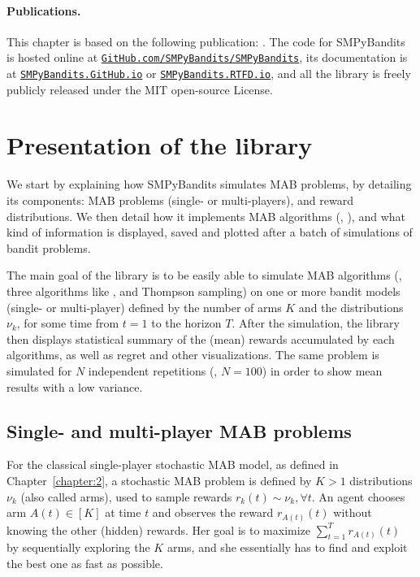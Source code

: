 \paragraph{Publications.}
%
This chapter is based on the following publication: \cite{SMPyBanditsJMLR}.
The code for SMPyBandits is hosted online at \texttt{\href{https://GitHub.com/SMPyBandits/SMPyBandits/}{GitHub.com/SMPyBandits/SMPyBandits}}, its documentation is at \texttt{\href{https://SMPyBandits.GitHub.io/}{SMPyBandits.GitHub.io}} or \texttt{\href{https://SMPyBandits.RTFD.io/}{SMPyBandits.RTFD.io}}, and all the library is freely publicly released under the MIT open-source License.


\section{Presentation of the library}
\label{sec:3:presentationLibrary}


We start by explaining how SMPyBandits simulates MAB problems, by detailing its components:
MAB problems (single- or multi-players),
and reward distributions.
%
We then detail how it implements MAB algorithms (\eg, \UCB),
and what kind of information is displayed, saved and plotted after a batch of simulations of bandit problems.

The main goal of the library is to be easily able to simulate MAB algorithms (\eg, three algorithms like \UCB, \klUCB{} and Thompson sampling) on one or more bandit models (single- or multi-player) defined by the number of arms $K$ and the distributions $\nu_k$, for some time from $t=1$ to the horizon $T$.
After the simulation, the library then displays statistical summary of the (mean) rewards accumulated by each algorithms, as well as regret and other visualizations.
The same problem is simulated for $N$ independent repetitions (\eg, $N=100$) in order to show mean results with a low variance.


\subsection{Single- and multi-player MAB problems}

For the classical single-player stochastic MAB model, as defined in Chapter~\ref{chapter:2},
a stochastic MAB problem is defined by $K>1$ distributions $\nu_k$ (also called arms),
used to sample \iid{} rewards $r_k(t) \sim \nu_k, \forall t$.
An agent chooses arm $A(t)\in[K]$ at time $t$ and observes the reward $r_{A(t)}(t)$ without knowing the other (hidden) rewards.
Her goal is to maximize $\sum_{t=1}^T r_{A(t)}(t)$ by sequentially exploring the $K$ arms, and she essentially has to find and exploit the best one as fast as possible.

